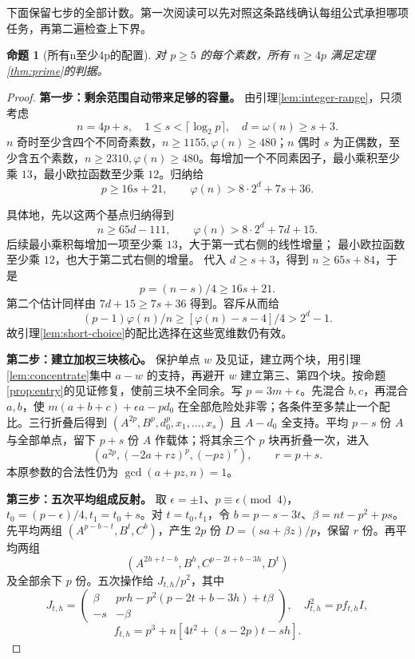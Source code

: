 \documentclass[11pt,a4paper,oneside,openany]{book}
\newtheorem{proposition}[theorem]{命题}
\theoremstyle{definition}
\numberwithin{equation}{chapter}
\begin{document}
下面保留七步的全部计数。第一次阅读可以先对照这条路线确认每组公式承担哪项任务，再第二遍检查上下界。
\begin{proposition}[所有n至少4p的配置]\label{prop:wide}
对 $p\ge5$ 的每个素数，所有 $n\ge4p$ 满足定理\ref{thm:prime}的判据。
\end{proposition}
\begin{proof}

\par\noindent\textbf{第一步：剩余范围自动带来足够的容量。}
由引理\ref{lem:integer-range}，只须考虑
\begin{equation}\label{eq:tail-range}
n=4p+s,\quad1\le s<\lceil\log_2p\rceil,\quad d=\omega(n)\ge s+3.
\end{equation}
$n$ 奇时至少含四个不同奇素数，$n\ge1155,\varphi(n)\ge480$；$n$ 偶时 $s$ 为正偶数，至少含五个素数，$n\ge2310,\varphi(n)\ge480$。每增加一个不同素因子，最小乘积至少乘 $13$，最小欧拉函数至少乘 $12$。归纳给
\begin{equation}\label{eq:tail-estimates}
p\ge16s+21,\qquad \varphi(n)>8\cdot2^d+7s+36.
\end{equation}

具体地，先以这两个基点归纳得到
\[
n\ge65d-111,\qquad \varphi(n)>8\cdot2^d+7d+15.
\]
后续最小乘积每增加一项至少乘 $13$，大于第一式右侧的线性增量；
最小欧拉函数至少乘 $12$，也大于第二式右侧的增量。
代入 $d\ge s+3$，得到 $n\ge65s+84$，于是
\[
p=(n-s)/4\ge16s+21.
\]
第二个估计同样由 $7d+15\ge7s+36$ 得到。容斥从而给
\[(p-1)\varphi(n)/n\ge[\varphi(n)-s-4]/4>2^d-1.
\]
故引理\ref{lem:short-choice}的配比选择在这些宽维数仍有效。


\par\noindent\textbf{第二步：建立加权三块核心。}
保护单点 $w$ 及见证，建立两个块，用引理\ref{lem:concentrate}集中 $a-w$ 的支持，再避开 $w$ 建立第三、第四个块。按命题\ref{prop:entry}的见证修复，使前三块不全同余。写 $p=3m+\epsilon$。先混合 $b,c$，再混合 $a,b$，使 $m(a+b+c)+\epsilon a-pd_0$ 在全部危险处非零；各条件至多禁止一个配比。三行折叠后得到 $(A^{2p},B^p,d_0^p,x_1,\ldots,x_s)$ 且 $A-d_0$ 全支持。平均 $p-s$ 份 $A$ 与全部单点，留下 $p+s$ 份 $A$ 作载体；将其余三个 $p$ 块再折叠一次，进入
\begin{equation}\label{eq:wide-core}
(a^{2p},(-2a+rz)^p,(-pz)^r),\qquad r=p+s.
\end{equation}
本原参数的合法性仍为 $\gcd(a+pz,n)=1$。


\par\noindent\textbf{第三步：五次平均组成反射。}
取 $\epsilon=\pm1$、$p\equiv\epsilon\pmod4$，$t_0=(p-\epsilon)/4,t_1=t_0+s$。对 $t=t_0,t_1$，令 $b=p-s-3t$、$\beta=nt-p^2+ps$。先平均两组 $(A^{p-b-t},B^t,C^b)$，产生 $2p$ 份 $D=(sa+\beta z)/p$，保留 $r$ 份。再平均两组
\[
(A^{2h+t-b},B^h,C^{p-2t+b-3h},D^t)
\]
及全部余下 $p$ 份。五次操作给 $J_{t,h}/p^2$，其中
\begin{equation}\label{eq:tail-J}
J_{t,h}=\begin{pmatrix}\beta&prh-p^2(p-2t+b-3h)+t\beta\\-s&-\beta\end{pmatrix},
\quad J_{t,h}^2=pf_{t,h}I,
\end{equation}
\[
f_{t,h}=p^3+n[4t^2+(s-2p)t-sh].
\]


\end{proof}
\end{document}
